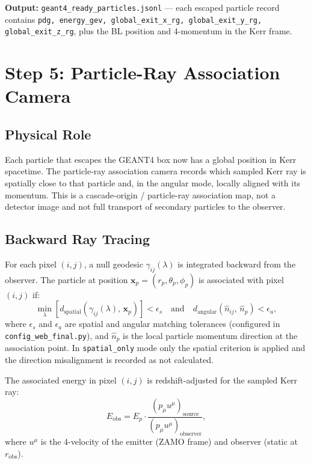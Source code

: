 \documentclass[11pt,a4paper]{article}
\begin{document}
\textbf{Output:} \texttt{geant4\_ready\_particles.jsonl} --- each escaped particle record contains \texttt{pdg, energy\_gev, global\_exit\_x\_rg, global\_exit\_y\_rg, global\_exit\_z\_rg}, plus the BL position and 4-momentum in the Kerr frame.

\section{Step 5: Particle-Ray Association Camera}
\label{sec:camera}

\subsection{Physical Role}

Each particle that escapes the GEANT4 box now has a global position in Kerr spacetime. The particle-ray association camera records which sampled Kerr ray is spatially close to that particle and, in the angular mode, locally aligned with its momentum. This is a cascade-origin / particle-ray association map, not a detector image and not full transport of secondary particles to the observer.

\subsection{Backward Ray Tracing}

For each pixel $(i,j)$, a null geodesic $\gamma_{ij}(\lambda)$ is integrated backward from the observer. The particle at position $\mathbf{x}_p = (r_p, \theta_p, \phi_p)$ is associated with pixel $(i,j)$ if:
\begin{equation}
  \min_\lambda \left[ d_\mathrm{spatial}(\gamma_{ij}(\lambda),\,\mathbf{x}_p) \right] < \epsilon_s
  \quad \text{and} \quad
  d_\mathrm{angular}(\hat{n}_{ij},\,\hat{n}_p) < \epsilon_a,
  \label{eq:matching}
\end{equation}
where $\epsilon_s$ and $\epsilon_a$ are spatial and angular matching tolerances (configured in \texttt{config\_web\_final.py}), and $\hat{n}_p$ is the local particle momentum direction at the association point. In \texttt{spatial\_only} mode only the spatial criterion is applied and the direction misalignment is recorded as not calculated.

The associated energy in pixel $(i,j)$ is redshift-adjusted for the sampled Kerr ray:
\begin{equation}
  E_\mathrm{obs} = E_p \cdot \frac{(p_\mu u^\mu)_\mathrm{source}}{(p_\mu u^\mu)_\mathrm{observer}},
  \label{eq:redshift}
\end{equation}
where $u^\mu$ is the 4-velocity of the emitter (ZAMO frame) and observer (static at $r_\mathrm{obs}$).
\end{document}
